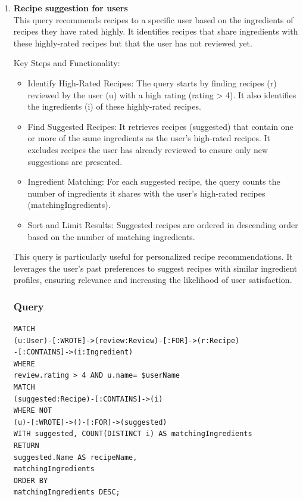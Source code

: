 \begin{enumerate}
    \clearpage
    \item \textbf{Recipe suggestion for users}\\
This  query recommends recipes to a specific user based on the ingredients of recipes they have rated highly. It identifies recipes that share ingredients with these highly-rated recipes but that the user has not reviewed yet.

Key Steps and Functionality:
\begin{itemize}
    \item Identify High-Rated Recipes:
The query starts by finding recipes (r) reviewed by the user (u) with a high rating (rating > 4). It also identifies the ingredients (i) of these highly-rated recipes.
    \item Find Suggested Recipes:
It retrieves recipes (suggested) that contain one or more of the same ingredients as the user's high-rated recipes. It excludes recipes the user has already reviewed to ensure only new suggestions are presented.
    \item Ingredient Matching:
For each suggested recipe, the query counts the number of ingredients it shares with the user's high-rated recipes (matchingIngredients).
    \item Sort and Limit Results:
Suggested recipes are ordered in descending order based on the number of matching ingredients.
\end{itemize}

This query is particularly useful for personalized recipe recommendations. It leverages the user's past preferences to suggest recipes with similar ingredient profiles, ensuring relevance and increasing the likelihood of user satisfaction.
    
    \subsubsection{Query}
    \begin{verbatim}
MATCH 
(u:User)-[:WROTE]->(review:Review)-[:FOR]->(r:Recipe)
-[:CONTAINS]->(i:Ingredient)
WHERE 
review.rating > 4 AND u.name= $userName
MATCH 
(suggested:Recipe)-[:CONTAINS]->(i)
WHERE NOT
(u)-[:WROTE]->()-[:FOR]->(suggested)
WITH suggested, COUNT(DISTINCT i) AS matchingIngredients
RETURN 
suggested.Name AS recipeName,
matchingIngredients
ORDER BY 
matchingIngredients DESC;
    \end{verbatim}

\end{enumerate}
